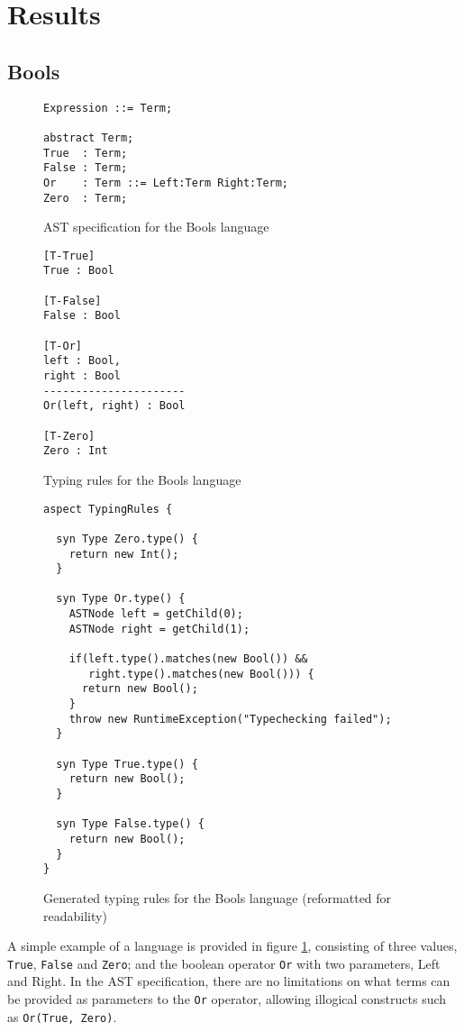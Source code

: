 \documentclass[nofilelist]{cslthse-msc}
\begin{document}
\section{Results} %
\subsection{Bools}

\begin{figure}[h]
\begin{lstlisting}[]
Expression ::= Term;

abstract Term;
True  : Term;
False : Term;
Or    : Term ::= Left:Term Right:Term;
Zero  : Term;
\end{lstlisting}
  \caption{AST specification for the Bools language}
  \label{boolsast}
\end{figure}
\begin{figure}[h]
\begin{lstlisting}[]
[T-True]
True : Bool

[T-False]
False : Bool

[T-Or]
left : Bool,
right : Bool
----------------------
Or(left, right) : Bool

[T-Zero]
Zero : Int
\end{lstlisting}
  \caption{Typing rules for the Bools language}
  \label{boolstr}
\end{figure}

\begin{figure}[h]
\begin{lstlisting}[language=jrag]
aspect TypingRules {

  syn Type Zero.type() {
    return new Int();
  }

  syn Type Or.type() {
    ASTNode left = getChild(0);
    ASTNode right = getChild(1);

    if(left.type().matches(new Bool()) &&
       right.type().matches(new Bool())) {
      return new Bool();
    }
    throw new RuntimeException("Typechecking failed");
  }

  syn Type True.type() {
    return new Bool();
  }

  syn Type False.type() {
    return new Bool();
  }
}
\end{lstlisting}
  \caption{Generated typing rules for the Bools language (reformatted for readability)}
  \label{boolstrgen}
\end{figure}
A simple example of a language is provided in figure \ref{boolsast}, consisting of three values, \verb|True|, \verb|False| and \verb|Zero|; and the boolean operator \verb|Or| with two parameters, Left and Right.
In the AST specification, there are no limitations on what terms can be provided as parameters to the \verb|Or| operator, allowing illogical constructs such as \verb|Or(True, Zero)|.
\end{document}
